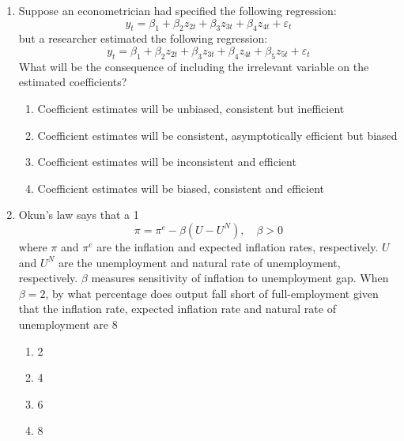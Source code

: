 \documentclass[journal,12pt,onecolumn]{exam}
\theoremstyle{remark}
\begin{document}
\begin{enumerate}
  \item Suppose an econometrician had specified the following regression:
  \[
  y_t = \beta_1 + \beta_2 z_{2t} + \beta_3 z_{3t} + \beta_4 z_{4t} + \varepsilon_t
  \]
  but a researcher estimated the following regression:
  \[
  y_t = \beta_1 + \beta_2 z_{2t} + \beta_3 z_{3t} + \beta_4 z_{4t} + \beta_5 z_{5t} + \varepsilon_t
  \]
  What will be the consequence of including the irrelevant variable on the estimated coefficients?
  \begin{enumerate}
    \item Coefficient estimates will be unbiased, consistent but inefficient
    \item Coefficient estimates will be consistent, asymptotically efficient but biased
    \item Coefficient estimates will be inconsistent and efficient
    \item Coefficient estimates will be biased, consistent and efficient
  \end{enumerate}
\newpage
\item Okun's law says that a 1%
  \[
  \pi = \pi^e - \beta(U - U^N), \quad \beta > 0
  \]
  where \(\pi\) and \(\pi^e\) are the inflation and expected inflation rates, respectively. \(U\) and \(U^N\) are the unemployment and natural rate of unemployment, respectively. \(\beta\) measures sensitivity of inflation to unemployment gap. When \(\beta = 2\), by what percentage does output fall short of full-employment given that the inflation rate, expected inflation rate and natural rate of unemployment are 8%
  \begin{enumerate}
    \item 2
    \item 4
    \item 6
    \item 8
  \end{enumerate}


\end{enumerate}
\end{document}
